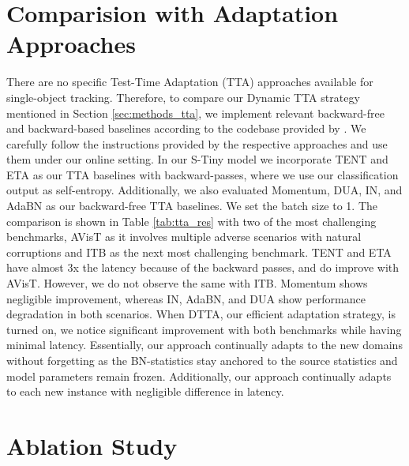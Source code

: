   \section{Comparision with Adaptation Approaches}\label{sec:tta_res}
  There are no specific Test-Time Adaptation (TTA) approaches available for single-object tracking. Therefore, to compare our Dynamic TTA strategy mentioned in Section \ref{sec:methods_tta}, we implement relevant backward-free and backward-based baselines according to the codebase provided by \cite{alfarra2023revisiting}. We carefully follow the instructions provided by the respective approaches and use them under our online setting. 
  In our S-Tiny model we incorporate TENT\cite{wang2020tent} and ETA\cite{niu2022efficient} as our TTA baselines with backward-passes,
  where we use our classification output as self-entropy. Additionally, we also evaluated Momentum\cite{schneider2020improving}, DUA\cite{mirza2022norm}, IN\cite{pan2018two}, and AdaBN\cite{li2016revisiting} as our backward-free TTA baselines. We set the batch size to 1. The comparison is shown in Table \ref{tab:tta_res} with two of the most challenging benchmarks, AVisT as it involves multiple adverse scenarios with natural corruptions and ITB as the next most challenging benchmark.
  TENT and ETA have almost 3x the latency because of the backward passes, and do improve with AVisT. However, we do not observe the same with ITB. Momentum shows negligible improvement, whereas IN, AdaBN, and DUA show performance degradation in both scenarios. When DTTA, our efficient adaptation strategy, is turned on, we notice significant improvement with both benchmarks while having minimal latency. Essentially, our approach continually adapts to the new domains without forgetting as the BN-statistics stay anchored to the source statistics and model parameters remain frozen. Additionally, our approach continually adapts to each new instance with negligible difference in latency.

  
  \section{Ablation Study}\label{sec:ablation}
  
  
  
